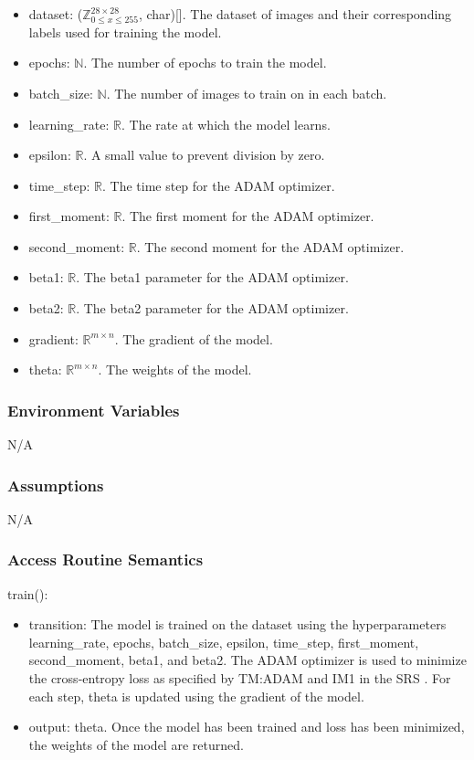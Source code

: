 \documentclass[12pt, titlepage]{article}
\begin{document}
\begin{itemize}
  \item dataset: ($\mathbb{Z}^{28 \times 28}_{0 \le x \le 255}$, char)[]. The
  dataset of images and their corresponding labels used for training the model.
  \item epochs: $\mathbb{N}$. The number of epochs to train the model.
  \item batch\_size: $\mathbb{N}$. The number of images to train on in each batch.
  \item learning\_rate: $\mathbb{R}$. The rate at which the model learns.
  \item epsilon: $\mathbb{R}$. A small value to prevent division by zero.
  \item time\_step: $\mathbb{R}$. The time step for the ADAM optimizer.
  \item first\_moment: $\mathbb{R}$. The first moment for the ADAM optimizer.
  \item second\_moment: $\mathbb{R}$. The second moment for the ADAM optimizer.
  \item beta1: $\mathbb{R}$. The beta1 parameter for the ADAM optimizer.
  \item beta2: $\mathbb{R}$. The beta2 parameter for the ADAM optimizer.
  \item gradient: $\mathbb{R}^{m \times n}$. The gradient of the model.
  \item theta: $\mathbb{R}^{m \times n}$. The weights of the model.
\end{itemize}

\subsubsection{Environment Variables}

N/A

\subsubsection{Assumptions}

N/A

\subsubsection{Access Routine Semantics}

\noindent train():
\begin{itemize}
\item transition: The model is trained on the dataset using the hyperparameters
learning\_rate, epochs, batch\_size, epsilon, time\_step, first\_moment,
second\_moment, beta1, and beta2. The ADAM optimizer is used to minimize the
cross-entropy loss as specified by TM:ADAM \cite[4.2.2]{SRS} and IM1 in the SRS
\cite[4.2.4]{SRS}. For each step, theta is updated using the gradient of the
model.
\item output: theta. Once the model has been trained and loss has been minimized,
the weights of the model are returned.
\end{itemize}
\end{document}

